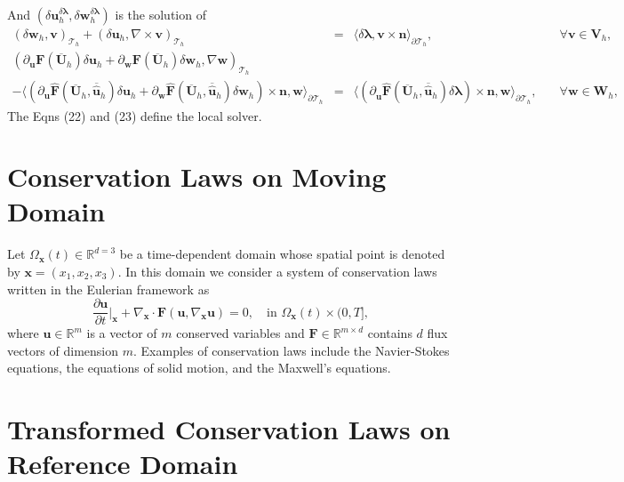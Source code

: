 \documentclass[11pt]{article}
\begin{document}
And $(\delta \bm{u}_h^{\delta \bm{\lambda}},\delta \bm{w}_h^{\delta \bm{\lambda}})$ is the solution of
\begin{equation}
\begin{array}{rcll}
(\delta \bm{w}_h, \bm{v})_{\mathcal{T}_h} + (\delta \bm{u}_h, \nabla \times \bm{v})_{\mathcal{T}_h}  & = & \langle \delta {\bm{\lambda}}, \bm{v} \times \bm{n} \rangle_{\partial \mathcal{T}_h} , & \quad \forall \bm{v} \in \bm{V}_h, \\[2ex] 
(\partial_{\bm{u}} \bm{F} (\overline{\bm{U}}_h) \delta \bm{u}_h + \partial_{\bm{w}} \bm{F} (\overline{\bm{U}}_h) \delta \bm{w}_h, \nabla \bm{w})_{\mathcal{T}_h} & & \\[2ex]
- \langle (\partial_{\bm{u}} \widehat{\bm{F}} (\overline{\bm{U}}_h, \overline{\widehat{\bm{u}}}_h) \delta \bm{u}_h + \partial_{{\bm{w}}} \widehat{\bm{F}} (\overline{\bm{U}}_h, \overline{\widehat{\bm{u}}}_h) \delta {\bm{w}}_h) \times \bm{n}, \bm{w} \rangle_{\partial \mathcal{T}_h}  & = &  \langle (\partial_{\widehat{\bm{u}}} \widehat{\bm{F}} (\overline{\bm{U}}_h, \overline{\widehat{\bm{u}}}_h) \delta {\bm{\lambda}}) \times \bm{n}, \bm{w} \rangle_{\partial \mathcal{T}_h},  & \quad \forall \bm{w} \in \bm{W}_h,
\end{array}
\end{equation}
The Eqns (22) and (23) define the local solver.


\section{Conservation Laws on Moving Domain}

Let $\Omega_{\bm{x}}(t) \in \mathbb{R}^{d=3}$ be a time-dependent domain whose spatial point is denoted by $\bm{x} = (x_1,x_2,x_3)$. In this domain we consider a system of conservation laws written in the Eulerian framework as
\begin{equation}
\displaystyle \frac{\partial\bm{u}}{\partial t} \Big|_{\bm{x}} + \nabla_{\bm{x}} \cdot  \bm{F}(\bm{u}, \nabla_{\bm{x}}\bm{u})  =  0, \quad \mbox{in } \Omega_{\bm{x}}(t) \times (0, T] , 
\end{equation}
where $\bm{u} \in \mathbb{R}^m$ is a vector of $m$ conserved variables and $\bm{F} \in \mathbb{R}^{m \times d}$ contains $d$ flux vectors of dimension $m$. Examples of conservation laws include the Navier-Stokes equations, the equations of solid motion, and the Maxwell's equations. 

\section{Transformed Conservation Laws on Reference Domain}
\end{document}
